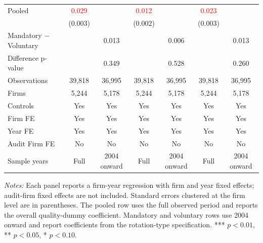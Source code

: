 \begin{table}[htbp]
\begin{threeparttable}
{\begin{tabular}{l cc cc cc}
Pooled & \textcolor{red}{0.029\sym{***}} &  & \textcolor{red}{0.012\sym{***}} &  & \textcolor{red}{0.023\sym{***}} &  \\
 & (0.003) &  & (0.002) &  & (0.003) &  \\
Mandatory $-$ Voluntary &  & 0.013 &  & 0.006 &  & 0.013 \\
Difference p-value &  & 0.349 &  & 0.528 &  & 0.260 \\
Observations & 39,818 & 36,995 & 39,818 & 36,995 & 39,818 & 36,995 \\
Firms & 5,244 & 5,178 & 5,244 & 5,178 & 5,244 & 5,178 \\
\midrule
Controls & Yes & Yes & Yes & Yes & Yes & Yes \\
Firm FE & Yes & Yes & Yes & Yes & Yes & Yes \\
Year FE & Yes & Yes & Yes & Yes & Yes & Yes \\
Audit Firm FE & No & No & No & No & No & No \\
Sample years & Full & 2004 onward & Full & 2004 onward & Full & 2004 onward \\
\bottomrule
\end{tabular}}
\begin{tablenotes}\footnotesize
\item \textit{Notes:} Each panel reports a firm-year regression with firm and year fixed effects; audit-firm fixed effects are not included. Standard errors clustered at the firm level are in parentheses. The pooled row uses the full observed period and reports the overall quality-dummy coefficient. Mandatory and voluntary rows use 2004 onward and report coefficients from the rotation-type specification. *** \(p<0.01\), ** \(p<0.05\), * \(p<0.10\).
\end{tablenotes}
\end{threeparttable}
\end{table}
